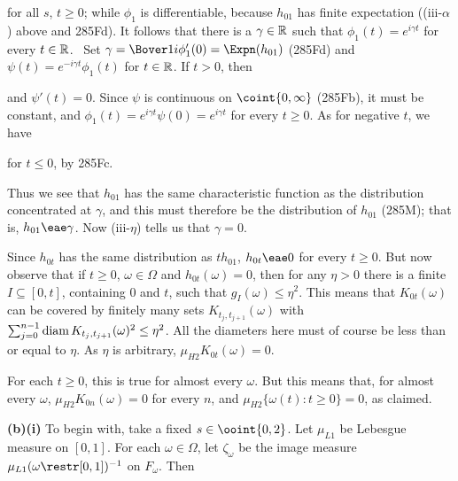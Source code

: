 {\noindent for all $s$, $t\ge 0$;  while $\phi_1$ is differentiable, because
$h_{01}$ has finite expectation ((iii-$\alpha$) above and 285Fd).
It follows that there is a
$\gamma\in\Bbb R$ such that $\phi_1(t)=e^{i\gamma t}$ for every
$t\in\Bbb R$.   \Prf\ Set $\gamma=\Bover1i\phi_1'(0)=\Expn(h_{01})$
(285Fd) and $\psi(t)=e^{-i\gamma t}\phi_1(t)$ for $t\in\Bbb R$.
If $t>0$, then


\noindent and $\psi'(t)=0$.
Since $\psi$ is continuous on $\coint{0,\infty}$ (285Fb), it must be
constant, and $\phi_1(t)=e^{i\gamma t}\psi(0)=e^{i\gamma t}$ for every
$t\ge 0$.   As for negative $t$, we have


\noindent for $t\le 0$, by 285Fc.\ \Qed

\medskip

Thus we see that $h_{01}$ has the same characteristic function
as the distribution concentrated at $\gamma$, and this must therefore be
the distribution of $h_{01}$ (285M);
that is, $h_{01}\eae\gamma$.   Now (iii-$\eta$) tells us that $\gamma=0$.

Since $h_{0t}$ has the same distribution as $th_{01}$, $h_{0t}\eae 0$ for
every $t\ge 0$.   But now observe that if $t\ge 0$, $\omega\in\Omega$ and
$h_{0t}(\omega)=0$, then for any $\eta>0$
there is a finite $I\subseteq[0,t]$, containing
$0$ and $t$, such that $g_I(\omega)\le\eta^2$.
This means that $K_{0t}(\omega)$ can be covered by finitely many
sets $K_{t_j,t_{j+1}}(\omega)$ with
$\sum_{j=0}^{n-1}\mathop{\text{diam}} K_{t_j,t_{j+1}}(\omega)^2\le\eta^2$.   All the
diameters here must of course be less than or equal to $\eta$.   As
$\eta$ is arbitrary, $\mu_{H2}K_{0t}(\omega)=0$.

For each $t\ge 0$, this is true for almost every $\omega$.   But this means
that, for almost every $\omega$, $\mu_{H2}K_{0n}(\omega)=0$ for every $n$,
and $\mu_{H2}\{\omega(t):t\ge 0\}=0$, as claimed.

\medskip

{\bf (b)(i)} To begin with, take a fixed $s\in\ooint{0,2}$.
Let $\mu_{L1}$ be Lebesgue measure on $[0,1]$.
For each $\omega\in\Omega$, let $\zeta_{\omega}$ be the image
measure $\mu_{L1}(\omega\restr[0,1])^{-1}$ on $F_{\omega}$.   Then

}
